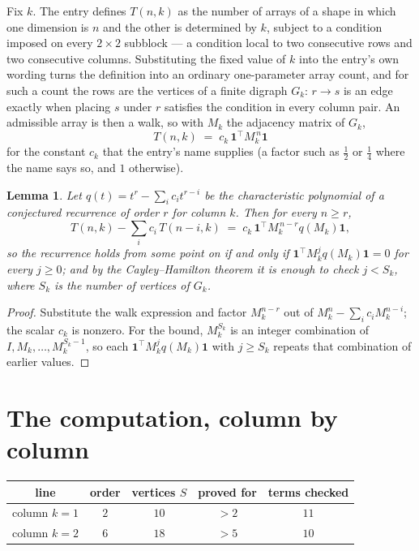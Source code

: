 \documentclass[11pt,a4paper]{article}
\theoremstyle{plain}
\newtheorem{lemma}[theorem]{Lemma}
\theoremstyle{definition}
\begin{document}
Fix $k$. The entry defines $T(n,k)$ as the number of arrays of a shape in which one dimension
is $n$ and the other is determined by $k$, subject to a condition imposed on every
$2\times2$ subblock --- a condition local to two consecutive rows and two consecutive columns.
Substituting the fixed value of $k$ into the entry's own wording turns the definition into an
ordinary one-parameter array count, and for such a count the rows are the vertices of a finite
digraph $G_k$: $r\to s$ is an edge exactly when placing $s$ under $r$ satisfies the condition
in every column pair. An admissible array is then a walk, so with $M_k$ the adjacency matrix
of $G_k$,
\[
T(n,k)\;=\;c_k\,\mathbf{1}^{\!\top}M_k^{\,n}\mathbf{1}
\]
for the constant $c_k$ that the entry's name supplies (a factor such as $\tfrac12$ or
$\tfrac14$ where the name says so, and $1$ otherwise).

\begin{lemma}\label{lem:crit}
Let $q(t)=t^{r}-\sum_i c_it^{r-i}$ be the characteristic polynomial of a conjectured
recurrence of order $r$ for column $k$. Then for every $n\ge r$,
\[
T(n,k)-\sum_i c_i\,T(n-i,k)\;=\;c_k\,\mathbf{1}^{\!\top}M_k^{\,n-r}q(M_k)\mathbf{1},
\]
so the recurrence holds from some point on if and only if
$\mathbf{1}^{\!\top}M_k^{j}q(M_k)\mathbf{1}=0$ for every $j\ge0$; and by the
Cayley--Hamilton theorem it is enough to check $j<S_k$, where $S_k$ is the number of vertices
of $G_k$.
\end{lemma}

\begin{proof}
Substitute the walk expression and factor $M_k^{n-r}$ out of $M_k^{n}-\sum_ic_iM_k^{n-i}$;
the scalar $c_k$ is nonzero. For the bound, $M_k^{S_k}$ is an integer combination of
$I,M_k,\dots,M_k^{S_k-1}$, so each $\mathbf{1}^{\!\top}M_k^{j}q(M_k)\mathbf{1}$ with
$j\ge S_k$ repeats that combination of earlier values.
\end{proof}

\section{The computation, column by column}

\begin{center}
\begin{tabular}{ccccc}
line & order & vertices $S$ & proved for & terms checked \\ \hline
column $k$$=1$ & $2$ & $10$ & $>2$ & $11$ \\
column $k$$=2$ & $6$ & $18$ & $>5$ & $10$ \\
\end{tabular}
\end{center}
\end{document}
